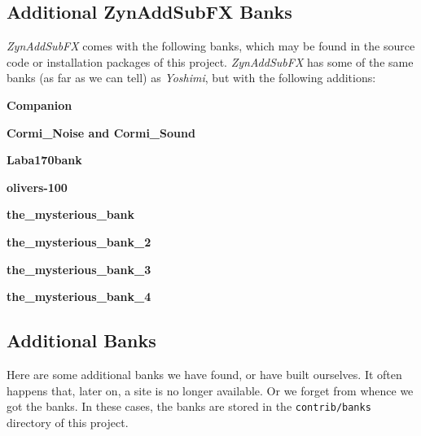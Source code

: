 \subsection{Additional ZynAddSubFX Banks}
\label{subsec:banks_collection_zynaddsubfx}

   \textsl{ZynAddSubFX} comes with the following banks, which may be found in
   the source code \cite{zynsource} or installation packages of this project.
   \textsl{ZynAddSubFX} has some of the same
   banks (as far as we can tell) as \textsl{Yoshimi}, but with the following
   additions:

   \begin{enumber}
      \item \textbf{Companion}
      \item \textbf{Cormi\_Noise and Cormi\_Sound} \cite{cormi}
      \item \textbf{Laba170bank}
      \item \textbf{olivers-100}
      \item \textbf{the\_mysterious\_bank}
      \item \textbf{the\_mysterious\_bank\_2}
      \item \textbf{the\_mysterious\_bank\_3}
      \item \textbf{the\_mysterious\_bank\_4}
   \end{enumber}

\subsection{Additional Banks}
\label{subsec:banks_collection_additional}

   Here are some additional banks we have found, or have built ourselves.
   It often happens that, later on, a site is no longer available.
   Or we forget from whence we got the banks.
   In these cases, the banks are stored in the \texttt{contrib/banks}
   directory of this project.

